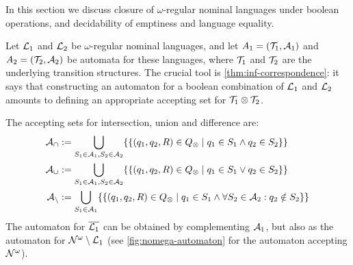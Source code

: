 \newcommand{\compl}[1]{\overline{#1}}
 
In this section we discuss closure of $\omega$-regular nominal languages under boolean operations, and decidability of emptiness and language equality.

Let $\mathcal{L}_1$ and $\mathcal{L}_2$ be $\omega$-regular nominal languages, and let $A_1 = (\mathcal{T}_1,\mathcal{A}_1)$  and $A_2 = (\mathcal{T}_2,\mathcal{A}_2)$ be automata for these languages, where $\mathcal{T}_1$ and $\mathcal{T}_2$ are the underlying transition structures.
The crucial tool is \cref{thm:inf-correspondence}: it says that constructing an automaton for a boolean combination of $\mathcal{L}_1$ and $\mathcal{L}_2$ amounts to defining an appropriate accepting set for $\mathcal{T}_1 \otimes \mathcal{T}_2$.

The accepting sets for intersection, union and difference are:
%
\begin{align*}
	\mathcal{A}_\cap &:= \bigcup_{S_1 \in \mathcal{A}_1,S_2 \in \mathcal{A}_2 } \{\{ (q_1,q_2,R) \in Q_{\otimes} \mid q_1 \in S_1 \land q_2 \in S_2 \}\} 
	\\
	\mathcal{A}_\cup &:= \bigcup_{S_1 \in \mathcal{A}_1,S_2 \in \mathcal{A}_2 } \{\{(q_1,q_2,R) \in Q_{\otimes} \mid q_1 \in S_1 \lor q_2 \in S_2 \}\} 
	\\
	\mathcal{A}_{\setminus} &:= \bigcup_{S_1 \in \mathcal{A}_1} \{\{ (q_1,q_2,R) \in Q_{\otimes} \mid q_1 \in S_1 \land \forall S_2 \in \mathcal{A}_2 : q_2 \notin S_2 \}\}
\end{align*}
%
The automaton for $\compl{\Lang_1}$ can be obtained by complementing $\mathcal{A}_1$, but also as the automaton for $\mathcal{N}^\omega \setminus \mathcal{L}_1$ (see \cref{fig:nomega-automaton} for the automaton accepting $\mathcal{N}^\omega$).


